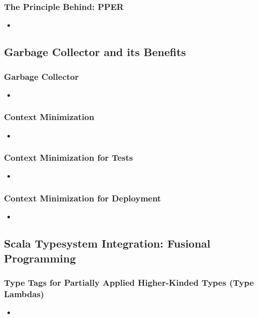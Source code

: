 \documentclass[usenames,dvipsnames]{beamer}
\begin{document}
\begin{frame}
\frametitle{The Principle Behind: PPER}
\begin{itemize}
\item 
\end{itemize}
\end{frame}

\subsection{Garbage Collector and its Benefits}

\begin{frame}
\frametitle{Garbage Collector}
\begin{itemize}
\item 
\end{itemize}
\end{frame}

\begin{frame}
\frametitle{Context Minimization}
\begin{itemize}
\item 
\end{itemize}
\end{frame}

\begin{frame}
\frametitle{Context Minimization for Tests}
\begin{itemize}
\item 
\end{itemize}
\end{frame}

\begin{frame}
\frametitle{Context Minimization for Deployment}
\begin{itemize}
\item 
\end{itemize}
\end{frame}

\subsection{Scala Typesystem Integration: Fusional Programming}

\begin{frame}
\frametitle{Type Tags for Partially Applied Higher-Kinded Types (Type Lambdas)}
\begin{itemize}
\item 
\end{itemize}
\end{frame}
\end{document}
